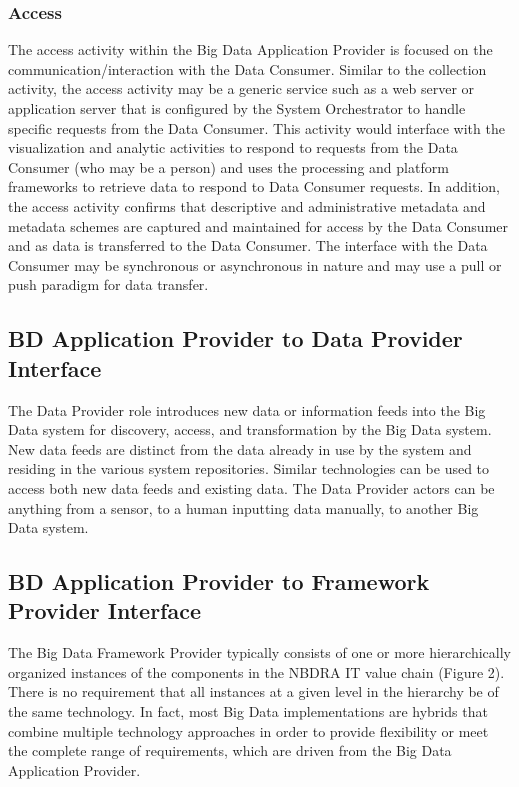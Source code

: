 \documentclass[11pt]{article}
\begin{document}
\subsubsection{Access}

The access activity within the Big Data Application Provider is focused on the communication/interaction 
with the Data Consumer. Similar to the collection activity, the access activity may be a generic service 
such as a web server or application server that is configured by the System Orchestrator to handle specific 
requests from the Data Consumer. This activity would interface with the visualization and analytic 
activities to respond to requests from the Data Consumer (who may be a person) and uses the processing 
and platform frameworks to retrieve data to respond to Data Consumer requests. In addition, the access 
activity confirms that descriptive and administrative metadata and metadata schemes are captured and 
maintained for access by the Data Consumer and as data is transferred to the Data Consumer. The 
interface with the Data Consumer may be synchronous or asynchronous in nature and may use a pull or 
push paradigm for data transfer. 

\subsection{BD Application Provider to Data Provider Interface}

The Data Provider role introduces new data or information feeds into the Big Data system for discovery, 
access, and transformation by the Big Data system. New data feeds are distinct from the data already in 
use by the system and residing in the various system repositories. Similar technologies can be used to 
access both new data feeds and existing data. The Data Provider actors can be anything from a sensor, to 
a human inputting data manually, to another Big Data system.

\subsection{BD Application Provider to Framework Provider
Interface}


The Big Data Framework Provider typically consists of one or more hierarchically organized instances of 
the components in the NBDRA IT value chain (Figure 2). There is no requirement that all instances at a 
given level in the hierarchy be of the same technology. In fact, most Big Data implementations are 
hybrids that combine multiple technology approaches in order to provide flexibility or meet the complete 
range of requirements, which are driven from the Big Data Application Provider. 
\end{document}
